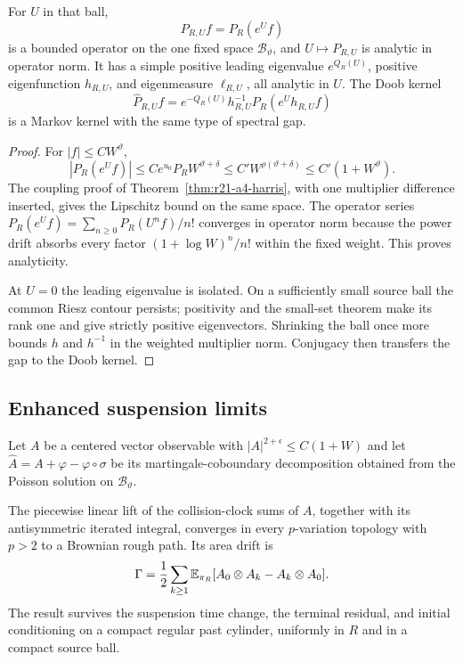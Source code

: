 \begin{theorem}
\label{thm:r21-a4-fk}
For $U$ in that ball,
\[
 P_{R,U}f=P_R(e^Uf)
\]
is a bounded operator on the one fixed space $\mathcal B_\vartheta$, and
$U\mapsto P_{R,U}$ is analytic in operator norm.  It has a simple positive
leading eigenvalue $e^{Q_R(U)}$, positive eigenfunction $h_{R,U}$, and
eigenmeasure $\ell_{R,U}$, all analytic in $U$.  The Doob kernel
\[
 \widehat P_{R,U}f=e^{-Q_R(U)}h_{R,U}^{-1}P_R(e^Uh_{R,U}f)
\]
is a Markov kernel with the same type of spectral gap.
\end{theorem}

\begin{proof}
For $|f|\le CW^\vartheta$,
\[
 |P_R(e^Uf)|\le Ce^{u_0}P_RW^{\vartheta+\delta}
 \le C'W^{\rho(\vartheta+\delta)}
 \le C'(1+W^\vartheta).
\]
The coupling proof of Theorem~\ref{thm:r21-a4-harris}, with one multiplier
difference inserted, gives the Lipschitz bound on the same space.  The
operator series
$P_R(e^Uf)=\sum_{n\ge0}P_R(U^nf)/n!$ converges in operator norm because the
power drift absorbs every factor $(1+\log W)^n/n!$ within the fixed weight.
This proves analyticity.

At $U=0$ the leading eigenvalue is isolated.  On a sufficiently small source
ball the common Riesz contour persists; positivity and the small-set theorem
make its rank one and give strictly positive eigenvectors.  Shrinking the ball
once more bounds $h$ and $h^{-1}$ in the weighted multiplier norm.  Conjugacy
then transfers the gap to the Doob kernel.
\end{proof}

\subsection{Enhanced suspension limits}

Let $A$ be a centered vector observable with
$|A|^{2+\epsilon}\le C(1+W)$ and let
$\widehat A=A+\varphi-\varphi\circ\sigma$ be its martingale-coboundary
decomposition obtained from the Poisson solution on $\mathcal B_\vartheta$.

\begin{theorem}
\label{thm:r21-a4-rough}
The piecewise linear lift of the collision-clock sums of $A$, together with
its antisymmetric iterated integral, converges in every $p$-variation topology
with $p>2$ to a Brownian rough path.  Its area drift is
\[
 \Gamma={1\over2}\sum_{k\ge1}
 \mathbb E_{\pi_R}[A_0\otimes A_k-A_k\otimes A_0].
\]
The result survives the suspension time change, the terminal residual, and
initial conditioning on a compact regular past cylinder, uniformly in $R$ and
in a compact source ball.
\end{theorem}

